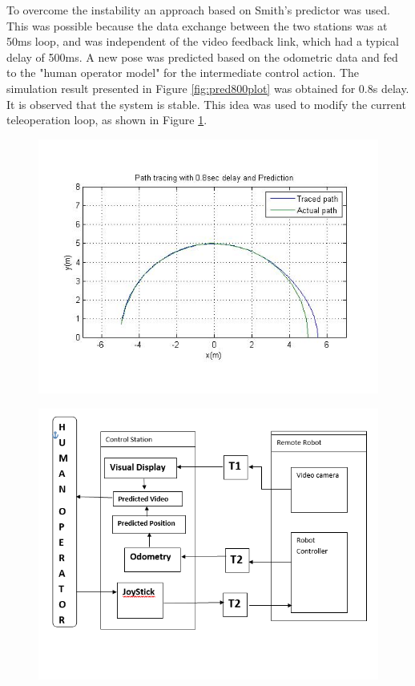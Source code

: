 \documentclass[12pt,a4paper, notitlepage]{article}
\begin{document}
To overcome the instability an approach based on Smith's predictor \cite{smith1959controller} was used. This was possible because the data exchange between the two stations was at 50ms loop, and was independent of the video feedback link, which had a typical delay of 500ms. A new pose was predicted based on the odometric data and fed to the "human operator model" for the intermediate control action. The simulation result presented in Figure \ref{fig:pred800plot} was obtained for 0.8s delay.  It is observed that the system is stable. This idea was used to modify the current teleoperation loop, as shown in Figure \ref{fig:predBlock}.  
 \begin{figure}[ht]
 	\begin{minipage}{.5\textwidth}
 		\includegraphics[width=\linewidth,keepaspectratio]{fig/withPrediction08delay}
 		\label{fig:pred800plot} 
 	\end{minipage} 
 	\begin{minipage}{.5\textwidth}
 		\includegraphics[width=\linewidth,keepaspectratio]{fig/PredictorBlockDig}
 		\label{fig:predBlock} 
 	\end{minipage}
 \end{figure}
\end{document}
